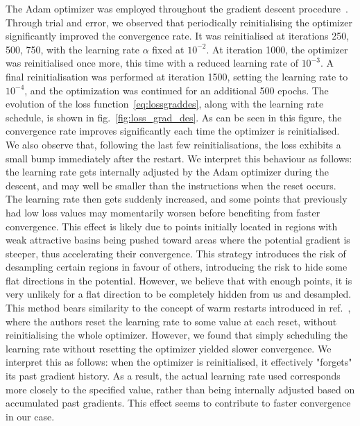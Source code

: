 \documentclass[11pt,a4paper]{article}
\begin{document}
	The Adam optimizer was employed throughout the gradient descent procedure~\cite{kingma2017adammethodstochasticoptimization}. Through trial and error, we observed that periodically reinitialising the optimizer significantly improved the convergence rate. It was reinitialised at iterations {250, 500, 750}, with the learning rate $\alpha$ fixed at $10^{-2}$. At iteration 1000, the optimizer was reinitialised once more, this time with a reduced learning rate of $10^{-3}$. A final reinitialisation was performed at iteration 1500, setting the learning rate to $10^{-4}$, and the optimization was continued for an additional 500 epochs. The evolution of the loss function~\eqref{eq:lossgraddes}, along with the learning rate schedule, is shown in fig.~\ref{fig:loss_grad_des}. As can be seen in this figure, the convergence rate improves significantly each time the optimizer is reinitialised. We also observe that, following the last few reinitialisations, the loss exhibits a small bump immediately after the restart. We interpret this behaviour as follows: the learning rate gets internally adjusted by the Adam optimizer during the descent, and may well be smaller than the instructions when the reset occurs. The learning rate then gets suddenly increased, and some points that previously had low loss values may momentarily worsen before benefiting from faster convergence. This effect is likely due to points initially located in regions with weak attractive basins being pushed toward areas where the potential gradient is steeper, thus accelerating their convergence. This strategy introduces the risk of desampling certain regions in favour of others, introducing the risk to hide some flat directions in the potential. However, we believe that with enough points, it is very unlikely for a flat direction to be completely hidden from us and desampled. This method bears similarity to the concept of warm restarts introduced in ref.~\cite{loshchilov2017sgdrstochasticgradientdescent}, where the authors reset the learning rate to some value at each reset, without reinitialising the whole optimizer. However, we found that simply scheduling the learning rate without resetting the optimizer yielded slower convergence. We interpret this as follows: when the optimizer is reinitialised, it effectively "forgets" its past gradient history. As a result, the actual learning rate used corresponds more closely to the specified value, rather than being internally adjusted based on accumulated past gradients. This effect seems to contribute to faster convergence in our case.
	
\end{document}
